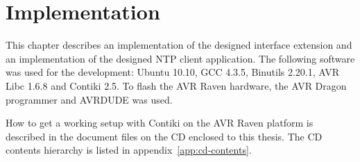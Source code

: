 
\chapter{Implementation}
This chapter describes an implementation of the designed interface extension
and an implementation of the designed NTP client application.
The following software was used for the development:
Ubuntu 10.10, GCC 4.3.5, Binutils 2.20.1, AVR Libc 1.6.8 and Contiki 2.5.
To flash the AVR Raven hardware, the AVR Dragon programmer and AVRDUDE %
was used.

How to get a working setup with Contiki on the AVR Raven platform is described in
the document files on the CD enclosed to this thesis.
The CD contents hierarchy is listed in appendix~\ref{app:cd-contents}.








